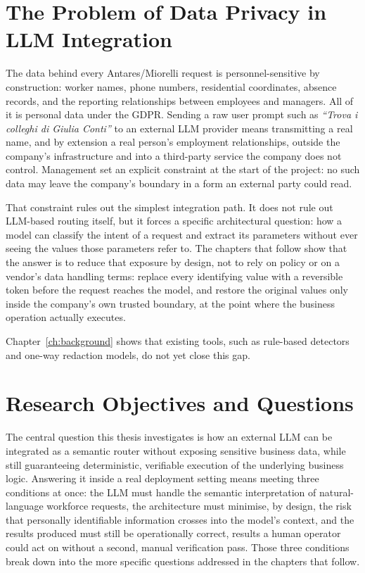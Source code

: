 \section{The Problem of Data Privacy in LLM Integration}
\label{sec:intro_privacy_problem}

The data behind every Antares/Miorelli request is personnel-sensitive by construction: worker names, phone numbers, residential coordinates, absence records, and the reporting relationships between employees and managers. All of it is personal data under the GDPR. Sending a raw user prompt such as \emph{``Trova i colleghi di Giulia Conti''} to an external LLM provider means transmitting a real name, and by extension a real person's employment relationships, outside the company's infrastructure and into a third-party service the company does not control. Management set an explicit constraint at the start of the project: no such data may leave the company's boundary in a form an external party could read.

That constraint rules out the simplest integration path. It does not rule out LLM-based routing itself, but it forces a specific architectural question: how a model can classify the intent of a request and extract its parameters without ever seeing the values those parameters refer to. The chapters that follow show that the answer is to reduce that exposure by design, not to rely on policy or on a vendor's data handling terms: replace every identifying value with a reversible token before the request reaches the model, and restore the original values only inside the company's own trusted boundary, at the point where the business operation actually executes.

Chapter~\ref{ch:background} shows that existing tools, such as rule-based detectors and one-way redaction models, do not yet close this gap.

\section{Research Objectives and Questions}
\label{sec:intro_objectives}

The central question this thesis investigates is how an external LLM can be integrated as a semantic router without exposing sensitive business data, while still guaranteeing deterministic, verifiable execution of the underlying business logic. Answering it inside a real deployment setting means meeting three conditions at once: the LLM must handle the semantic interpretation of natural-language workforce requests, the architecture must minimise, by design, the risk that personally identifiable information crosses into the model's context, and the results produced must still be operationally correct, results a human operator could act on without a second, manual verification pass. Those three conditions break down into the more specific questions addressed in the chapters that follow.

